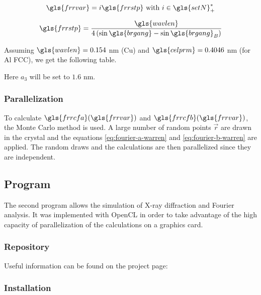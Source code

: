 \begin{equation}\label{eq:fourier-L-step}
\gls{frrvar} = i \gls{frrstp} \ \text{with} \ i \in \gls{setN}^*_+
\end{equation}

\begin{equation}\label{eq:fourier-a3}
\gls{frrstp} = \frac{\gls{wavlen}}{4 \left( \sin \gls{brgang} - \sin \gls{brgang}_B \right)}
\end{equation}

\medskip

Assuming \( \gls{wavlen} = 0.154 \) nm (Cu) and \( \gls{celprm} =  0.4046 \) nm  (for Al FCC), we get the following table.

\medskip

{\renewcommand{\arraystretch}{1.6}




Here \( a_3 \) will be set to \( 1.6 \) nm.

\subsubsection{Parallelization}

To calculate \( \gls{frrcfa}(\gls{frrvar}) \) and \( \gls{frrcfb}(\gls{frrvar}) \), the Monte Carlo method is used.
A large number of random points \( \vec{r} \) are drawn in the crystal and the equations \eqref{eq:fourier-a-warren} and \eqref{eq:fourier-b-warren} are applied. The random draws and the calculations are then parallelized since they are independent.

\subsection{Program}

The second program allows the simulation of X-ray diffraction and Fourier analysis.
It was implemented with OpenCL in order to take advantage of the high capacity of parallelization of the calculations on a graphics card.

\subsubsection{Repository}

Useful information can be found on the project page: 

\subsubsection{Installation}

}
